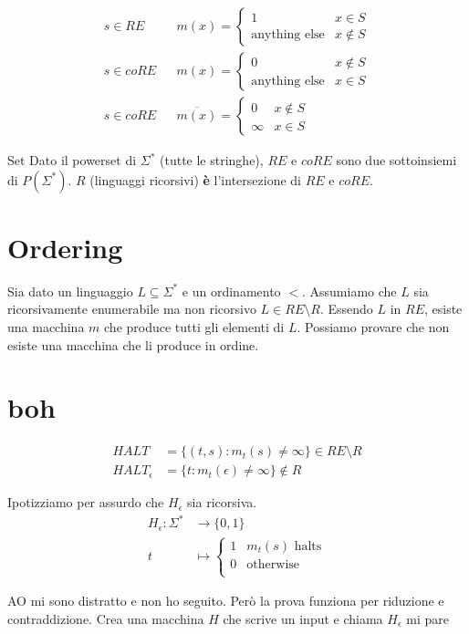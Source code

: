 \documentclass{article}
\begin{document}
\begin{align*}
    s\in RE && m(x) = \begin{cases}
        1 & x\in S \\
        \text{anything else} & x\not\in S
    \end{cases} 
    \\
        s\in coRE && m(x) = \begin{cases}
        0 & x\not\in S \\
        \text{anything else} & x\in S
    \end{cases}
    \\
        s\in coRE && \overline{m(x)} = \begin{cases}
        0 & x\not\in S \\
        \infty & x\in S
    \end{cases}
\end{align*}

\begin{callout}{Set}
    Dato il powerset di $\Sigma^*$ (tutte le stringhe), $RE$ e $coRE$ sono due sottoinsiemi di $P(\Sigma^*)$. $R$ (linguaggi ricorsivi) \textbf{è} l'intersezione di $RE$ e $coRE$.
\end{callout}

\section{Ordering}
Sia dato un linguaggio $L\subseteq \Sigma^*$ e un ordinamento $<$. Assumiamo che $L$ sia ricorsivamente enumerabile ma non ricorsivo $L\in RE\setminus R$.
Essendo $L$ in $RE$, esiste una macchina $m$ che produce tutti gli elementi di $L$. Possiamo provare che non esiste una macchina che li produce in ordine.

\section{boh}
\begin{align*}
    HALT &= \{(t,s): m_t(s)\neq\infty\} \in RE\setminus R \\
    HALT_\epsilon &= \{t: m_t(\epsilon)\neq\infty\} \not\in R
\end{align*}

Ipotizziamo per assurdo che $H_\epsilon$ sia ricorsiva.
\begin{align*}
    H_\epsilon: \Sigma^*&\to\{0,1\} \\
    t &\mapsto \begin{cases}
        1 & m_t(s)\text{ halts} \\
        0 & \text{otherwise} \\
    \end{cases}
\end{align*}
\begin{warning}{AO}
    mi sono distratto e non ho seguito. Però la prova funziona per riduzione e contraddizione. Crea una macchina $H$ che scrive un input e chiama $H_\epsilon$ mi pare
\end{warning}
\end{document}
